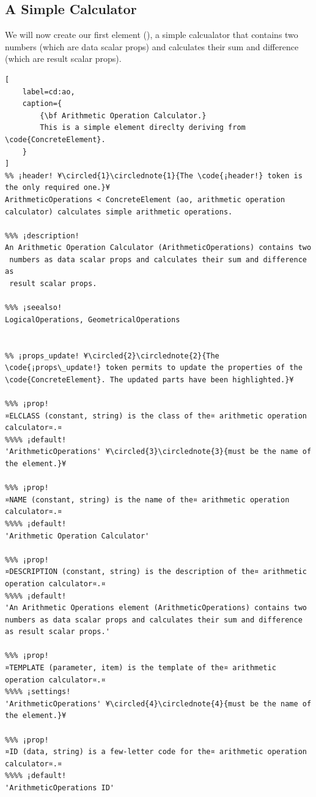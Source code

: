 \documentclass{tufte-handout}
\begin{document}
\subsection{A Simple Calculator}

We will now create our first element (), a simple calcualator that contains two numbers (which are data scalar props) and calculates their sum and difference (which are result scalar props).

\begin{lstlisting}[
	label=cd:ao,
	caption={
		{\bf Arithmetic Operation Calculator.}
		This is a simple element direclty deriving from \code{ConcreteElement}.
	}
]
%% ¡header! ¥\circled{1}\circlednote{1}{The \code{¡header!} token is the only required one.}¥
ArithmeticOperations < ConcreteElement (ao, arithmetic operation calculator) calculates simple arithmetic operations.

%%% ¡description!
An Arithmetic Operation Calculator (ArithmeticOperations) contains two 
 numbers as data scalar props and calculates their sum and difference as 
 result scalar props.

%%% ¡seealso!
LogicalOperations, GeometricalOperations


%% ¡props_update! ¥\circled{2}\circlednote{2}{The \code{¡props\_update!} token permits to update the properties of the \code{ConcreteElement}. The updated parts have been highlighted.}¥

%%% ¡prop!
¤ELCLASS (constant, string) is the class of the¤ arithmetic operation calculator¤.¤
%%%% ¡default!
'ArithmeticOperations' ¥\circled{3}\circlednote{3}{must be the name of the element.}¥

%%% ¡prop!
¤NAME (constant, string) is the name of the¤ arithmetic operation calculator¤.¤
%%%% ¡default!
'Arithmetic Operation Calculator'

%%% ¡prop!
¤DESCRIPTION (constant, string) is the description of the¤ arithmetic operation calculator¤.¤
%%%% ¡default!
'An Arithmetic Operations element (ArithmeticOperations) contains two numbers as data scalar props and calculates their sum and difference as result scalar props.'

%%% ¡prop!
¤TEMPLATE (parameter, item) is the template of the¤ arithmetic operation calculator¤.¤
%%%% ¡settings!
'ArithmeticOperations' ¥\circled{4}\circlednote{4}{must be the name of the element.}¥

%%% ¡prop!
¤ID (data, string) is a few-letter code for the¤ arithmetic operation calculator¤.¤
%%%% ¡default!
'ArithmeticOperations ID'


\end{lstlisting}
\end{document}
